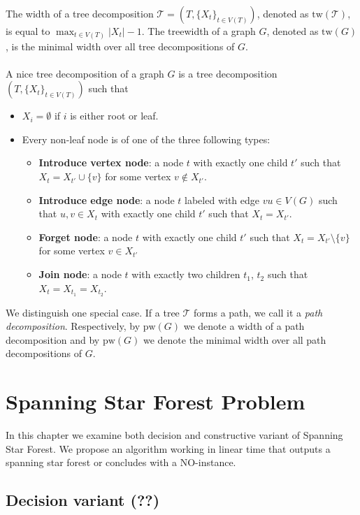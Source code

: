 \documentclass[en]{pracamgr}
\newcommand{\ssf}{spanning star forest}
\newcommand{\ssfp}{{\sc Spanning Star Forest}}
\begin{document}
The width of a tree decomposition $\mathcal{T} = (T,\{X_t\}_{t\in V(T)})$, denoted as $\textrm{tw}(\mathcal{T})$, is equal to $\max_{t \in V(T)} |X_t| - 1$. The treewidth of a graph $G$, denoted as $\textrm{tw}(G)$, is the minimal width over all tree decompositions of $G$.
\\\\
A nice tree decomposition of a graph $G$ is a tree decomposition $(T, \{X_t\}_{t \in V(T)})$ such that
\begin{itemize}
	\item $X_i = \emptyset$ if $i$ is either root or leaf.
	\item Every non-leaf node is of one of the three following types:
	\begin{itemize}
		\item \textbf{Introduce vertex node}: a node $t$ with exactly one child $t'$ such that $X_t = X_{t'} \cup \{v\}$ for some vertex $v \notin X_{t'}$.
		\item \textbf{Introduce edge node}: a node $t$ labeled with edge $vu \in V(G)$ such that $u,v \in X_t$ with exactly one child $t'$ such that $X_t = X_{t'}$.
		\item \textbf{Forget node}: a node $t$ with exactly one child $t'$ such that $X_t = X_{t'} \setminus \{v\}$ for some vertex $v \in X_{t'}$
		\item \textbf{Join node}: a node $t$ with exactly two children $t_1$, $t_2$ such that $X_t = X_{t_1} = X_{t_2}$.
	\end{itemize}
\end{itemize}

We distinguish one special case. If a tree $\mathcal{T}$ forms a path, we call it a \emph{path decomposition}. Respectively, by $\textrm{pw}(G)$ we denote a width of a path decomposition and by $\textrm{pw}(G)$ we denote the minimal width over all path decompositions of $G$.

\chapter{Spanning Star Forest Problem}

In this chapter we examine both decision and constructive variant of \ssfp{}. We propose an algorithm working in linear time that outputs a \ssf{} or concludes with a NO-instance.

\section{Decision variant (??)}
\end{document}
